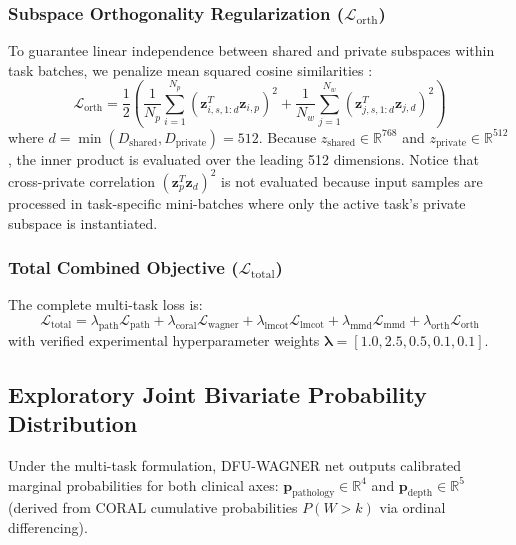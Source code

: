 \documentclass[journal]{IEEEtran}
\begin{document}
\subsubsection{Subspace Orthogonality Regularization ($\mathcal{L}_{\text{orth}}$)}
To guarantee linear independence between shared and private subspaces within task batches, we penalize mean squared cosine similarities \cite{bousmalis2016domain}:
\begin{equation}
    \mathcal{L}_{\text{orth}} = \frac{1}{2} \left( \frac{1}{N_p} \sum_{i=1}^{N_p} \left( \mathbf{z}_{i, s, 1:d}^T \mathbf{z}_{i, p} \right)^2 + \frac{1}{N_w} \sum_{j=1}^{N_w} \left( \mathbf{z}_{j, s, 1:d}^T \mathbf{z}_{j, d} \right)^2 \right)
\end{equation}
where $d = \min(D_{\text{shared}}, D_{\text{private}}) = 512$. Because $z_{\text{shared}} \in \mathbb{R}^{768}$ and $z_{\text{private}} \in \mathbb{R}^{512}$, the inner product is evaluated over the leading 512 dimensions. Notice that cross-private correlation $(\mathbf{z}_p^T \mathbf{z}_d)^2$ is not evaluated because input samples are processed in task-specific mini-batches where only the active task's private subspace is instantiated.

\subsubsection{Total Combined Objective ($\mathcal{L}_{\text{total}}$)}
The complete multi-task loss is:
\begin{equation}
    \mathcal{L}_{\text{total}} = \lambda_{\text{path}} \mathcal{L}_{\text{path}} + \lambda_{\text{coral}} \mathcal{L}_{\text{wagner}} + \lambda_{\text{lmcot}} \mathcal{L}_{\text{lmcot}} + \lambda_{\text{mmd}} \mathcal{L}_{\text{mmd}} + \lambda_{\text{orth}} \mathcal{L}_{\text{orth}}
\end{equation}
with verified experimental hyperparameter weights $\boldsymbol{\lambda} = [1.0, 2.5, 0.5, 0.1, 0.1]$.

\subsection{Exploratory Joint Bivariate Probability Distribution}
Under the multi-task formulation, DFU-WAGNER net outputs calibrated marginal probabilities for both clinical axes: $\mathbf{p}_{\text{pathology}} \in \mathbb{R}^4$ and $\mathbf{p}_{\text{depth}} \in \mathbb{R}^5$ (derived from CORAL cumulative probabilities $P(W > k)$ via ordinal differencing). 
\end{document}
